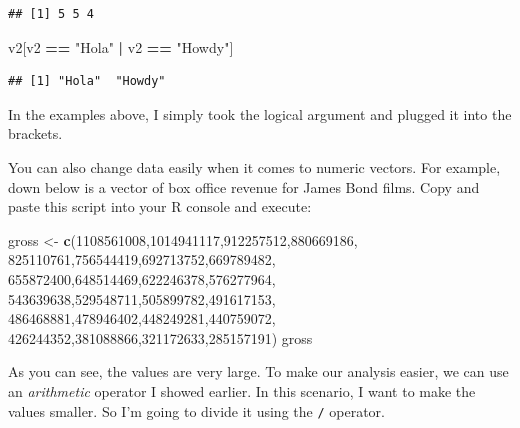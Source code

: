 \documentclass[
]{book}
\newenvironment{Shaded}{\begin{snugshade}}{\end{snugshade}}
\newcommand{\DecValTok}[1]{\textcolor[rgb]{0.00,0.00,0.81}{#1}}
\newcommand{\KeywordTok}[1]{\textcolor[rgb]{0.13,0.29,0.53}{\textbf{#1}}}
\newcommand{\NormalTok}[1]{#1}
\newcommand{\OperatorTok}[1]{\textcolor[rgb]{0.81,0.36,0.00}{\textbf{#1}}}
\newcommand{\StringTok}[1]{\textcolor[rgb]{0.31,0.60,0.02}{#1}}
\begin{document}
\begin{verbatim}
## [1] 5 5 4
\end{verbatim}

\begin{Shaded}
\begin{Highlighting}[]
\NormalTok{v2[v2 }\OperatorTok{==}\StringTok{ "Hola"} \OperatorTok{|}\StringTok{ }\NormalTok{v2 }\OperatorTok{==}\StringTok{ "Howdy"}\NormalTok{]}
\end{Highlighting}
\end{Shaded}

\begin{verbatim}
## [1] "Hola"  "Howdy"
\end{verbatim}

In the examples above, I simply took the logical argument and plugged it into the brackets.

You can also change data easily when it comes to numeric vectors. For example, down below is a vector of box office revenue for James Bond films. Copy and paste this script into your R console and execute:

\begin{Shaded}
\begin{Highlighting}[]
\NormalTok{gross <-}\StringTok{ }
\StringTok{  }\KeywordTok{c}\NormalTok{(}\DecValTok{1108561008}\NormalTok{,}\DecValTok{1014941117}\NormalTok{,}\DecValTok{912257512}\NormalTok{,}\DecValTok{880669186}\NormalTok{,}
    \DecValTok{825110761}\NormalTok{,}\DecValTok{756544419}\NormalTok{,}\DecValTok{692713752}\NormalTok{,}\DecValTok{669789482}\NormalTok{,}
    \DecValTok{655872400}\NormalTok{,}\DecValTok{648514469}\NormalTok{,}\DecValTok{622246378}\NormalTok{,}\DecValTok{576277964}\NormalTok{,}
    \DecValTok{543639638}\NormalTok{,}\DecValTok{529548711}\NormalTok{,}\DecValTok{505899782}\NormalTok{,}\DecValTok{491617153}\NormalTok{,}
    \DecValTok{486468881}\NormalTok{,}\DecValTok{478946402}\NormalTok{,}\DecValTok{448249281}\NormalTok{,}\DecValTok{440759072}\NormalTok{,}
    \DecValTok{426244352}\NormalTok{,}\DecValTok{381088866}\NormalTok{,}\DecValTok{321172633}\NormalTok{,}\DecValTok{285157191}\NormalTok{)}
\NormalTok{gross}
\end{Highlighting}
\end{Shaded}

As you can see, the values are very large. To make our analysis easier, we can use an \emph{arithmetic} operator I showed earlier. In this scenario, I want to make the values smaller. So I'm going to divide it using the \texttt{/} operator.
\end{document}
